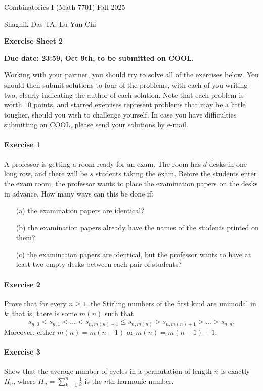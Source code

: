 \documentclass[a4paper,12pt]{article}
\newcommand{\courseTitle}{Combinatorics I (Math 7701)}
\newcommand{\semester}{Fall 2025}
\newcommand{\instructorA}{Shagnik Das}
\newcommand{\instructorB}{TA: Lu Yun-Chi}
\newcommand{\sheetNumber}{2}
\newcommand{\dueDate}{23:59, Oct 9th, to be submitted on COOL.}
\newcommand{\buildtitle}[4]{
\begin{flushleft}
{\large
#1
\hfill{}
#2
\par
#3
}
\end{flushleft}
\vskip 4pt
\begin{center}
{\large\bfseries#4\par}
\end{center}
\bigskip
}
\begin{document}
\buildtitle{\courseTitle{}}{\semester}{\instructorA{} \hfill \instructorB{}}{Exercise Sheet \sheetNumber{}}

\vspace{-0.2in}

\begin{center}

{\bf Due date: \dueDate{}}

\end{center}

\noindent Working with your partner, you should try to solve all of the exercises below. You should then submit solutions to four of the problems, with each of you writing two, clearly indicating the author of each solution. Note that each problem is worth $10$ points, and starred exercises represent problems that may be a little tougher, should you wish to challenge yourself. In case you have difficulties submitting on COOL, please send your solutions by e-mail.

\paragraph{Exercise 1}  A professor is getting a room ready for an exam.  The room has $d$ desks in one long row, and there will be $s$ students taking the exam.  Before the students enter the exam room, the professor wants to place the examination papers on the desks in advance.  How many ways can this be done if:
\begin{itemize}
	\item[(a)] the examination papers are identical?
	\item[(b)] the examination papers already have the names of the students printed on them?
	\item[(c)] the examination papers are identical, but the professor wants to have at least two empty desks between each pair of students?
\end{itemize}

\paragraph{Exercise 2}  Prove that for every $n \ge 1$, the Stirling numbers of the first kind are unimodal in $k$; that is, there is some $m(n)$ such that
\[ s_{n,0} < s_{n,1} < \hdots < s_{n,m(n)-1} \le s_{n,m(n)} > s_{n,m(n)+ 1} > \hdots > s_{n,n}. \]
Moreover, either $m(n) = m(n-1)$ or $m(n) = m(n-1) + 1$.

\paragraph{Exercise 3}  Show that the average number of cycles in a permutation of length $n$ is exactly $H_n$, where $H_n = \sum_{k=1}^{n} \frac{1}{k}$ is the $n$th harmonic number.
\end{document}
